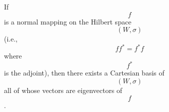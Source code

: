 If $$f$$ is a normal mapping on the Hilbert space $$(W, \sigma)$$ (i.e., $$ff^* = f^*f$$ where $$f^*$$ is the adjoint), then there exists a Cartesian basis of $$(W, \sigma)$$ all of whose vectors are eigenvectors of $$f$$.

